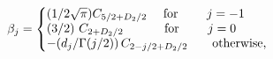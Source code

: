 \begin{equation}
    \label{betas}
    \beta_j=
    \left\{
        \begin{minipage}[c]{7cm}
            $(1/ 2\sqrt{\pi}) C_{5/2 + D_2/2} \quad$
            {\rm for}     \qquad  $j=-1$\\
            ${(3/ 2)} \ C_{2+D_2/2} \quad\qquad$ {\rm for}
            \qquad $j=0$\\
            $-(d_j / \Gamma(j/2))\,C_{2-j/2+D_2/2} \qquad
            \rm{otherwise}$,
    \end{minipage}
\right.
\end{equation}

